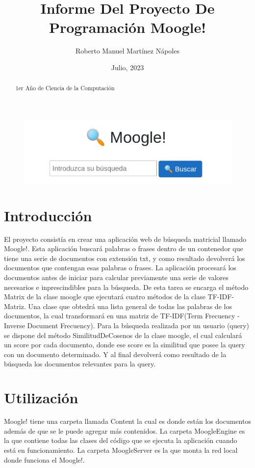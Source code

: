 \documentclass[spanish,10pt,a4paper]{article}
\begin{document}
	\title{Informe Del Proyecto De Programación Moogle!}
	\author{Roberto Manuel Martínez Nápoles}
	\date{Julio, 2023}
	\maketitle
	\begin{abstract}
		\center 
		1er Año de Ciencia de la Computación  
	\end{abstract}
	\begin{figure}[h]
	\center
	\includegraphics[width=12cm]{foto/moogle.png}
	\end{figure}
	
	\newpage
	
	
	\section{Introducción}\label{sec:intro}
	El proyecto consistía en crear una aplicación web de búsqueda matricial llamado Moogle!.  Esta aplicación buscará palabras o frases dentro de un contenedor que tiene una serie de documentos con extensión txt, y como resultado devolverá los documentos que contengan esas palabras o frases. 
	La aplicación  procesará los documentos antes de iniciar para calcular previamente una serie de valores necesarios e inprescindibles para la búsqueda. De esta tarea se encarga el método Matrix  de la clase moogle que ejecutará cuatro métodos de la clase TF-IDF-Matriz. Una clase que obtedrá una lista general de todas las palabras de los documentos, la cual transformará en una matriz de TF-IDF(Term Frecuency - Inverse Document Frecuency).
	Para la búsqueda realizada por un usuario (query) se dispone del método SimilitudDeCosenos de la clase moogle, el cual calculará un score por cada documento, donde ese score es la similitud que posee la query con un documento determinado. Y al final devolverá como resultado de la búsqueda los documentos relevantes para la query.
	
	
	
	\newpage
	\section{Utilización}\label{sec:utilización}
	Moogle! tiene una carpeta llamada Content la cual es donde están los documentos además de que se le puede agregar más contenidos. La carpeta MoogleEngine es la que contiene todas las clases del código que se ejecuta la aplicación cuando  está en funcionamiento. La carpeta MoogleServer es la que monta la red local donde funciona el Moogle!.
	
\end{document}
